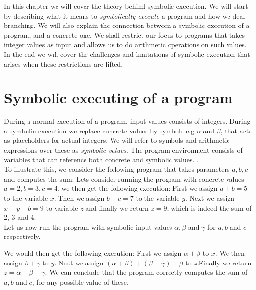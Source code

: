 In this chapter we will cover the theory behind symbolic execution. We will start by describing what it means to \emph{symbolically execute} a program and how we deal branching. We will also explain the connection between a symbolic execution of a program, and a concrete one. We shall restrict our focus to programs that takes integer values as input and allows us to do arithmetic operations on such values. In the end we will cover the challenges and limitations of symbolic execution that arises when these restrictions are lifted. 


\section{Symbolic executing of a program}
	
	During a normal execution of a program, input values consists of integers. During a symbolic execution we replace concrete values by symbols e.g $\alpha$ and $ \beta$, that acts as placeholders for actual integers. We will refer to symbols and arithmetic expressions over these as \emph{symbolic values}.
	 The program environment consists of variables that can reference both concrete and symbolic values. \cite{CadarSen13}.
	\\
	To illustrate this, we consider the following program that takes parameters $a, b, c$ and computes the sum:
	\sumprogram{}
	Lets consider running the program with concrete values $a = 2, b = 3, c = 4$. we then get the following execution:
	First we assign $a+b = 5$ to the variable $x$. Then we assign $b + c = 7$ to the variable $y$. Next we assign $x + y - b = 9$ to variable $z$ and finally we return $z = 9$, which is indeed the sum of 2, 3 and 4. 
	\\
	Let us now run the program with symbolic input values $\alpha, \beta$ and $\gamma$ for $a, b$ and $c$ respectively. 

	
	We would then get the following execution: First we assign $\alpha + \beta$ to $x$. We then assign $\beta + \gamma$ to $y$. Next we assign $(\alpha + \beta) + (\beta + \gamma) - \beta$ to $z$.Finally we return $z = \alpha + \beta + \gamma$. We can conclude that the program correctly computes the sum of $a, b$ and $c$, for any possible value of these.
	
